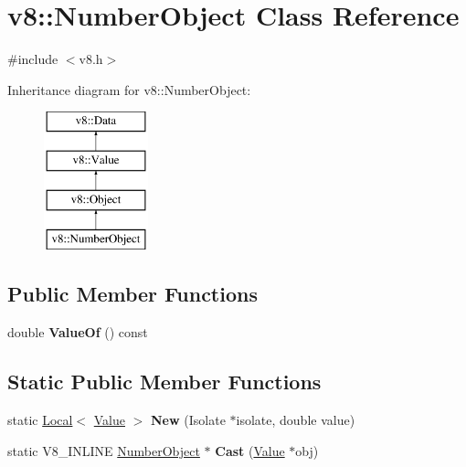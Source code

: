 \hypertarget{classv8_1_1NumberObject}{}\section{v8\+:\+:Number\+Object Class Reference}
\label{classv8_1_1NumberObject}


{\ttfamily \#include $<$v8.\+h$>$}

Inheritance diagram for v8\+:\+:Number\+Object\+:\begin{figure}[H]
\begin{center}
\leavevmode
\includegraphics[height=4.000000cm]{classv8_1_1NumberObject}
\end{center}
\end{figure}
\subsection*{Public Member Functions}
\begin{DoxyCompactItemize}
\item 
\mbox{\label{classv8_1_1NumberObject_abe15c092159cea5dc15908cce77b8a40}} 
double {\bfseries Value\+Of} () const
\end{DoxyCompactItemize}
\subsection*{Static Public Member Functions}
\begin{DoxyCompactItemize}
\item 
\mbox{\label{classv8_1_1NumberObject_ad6e3d9fe36d6389fe90f2645cab8a2d7}} 
static \mbox{\hyperlink{classv8_1_1Local}{Local}}$<$ \mbox{\hyperlink{classv8_1_1Value}{Value}} $>$ {\bfseries New} (Isolate $\ast$isolate, double value)
\item 
\mbox{\label{classv8_1_1NumberObject_a77500b6fed40f36fed616e865fd1ed07}} 
static V8\+\_\+\+I\+N\+L\+I\+NE \mbox{\hyperlink{classv8_1_1NumberObject}{Number\+Object}} $\ast$ {\bfseries Cast} (\mbox{\hyperlink{classv8_1_1Value}{Value}} $\ast$obj)
\end{DoxyCompactItemize}


